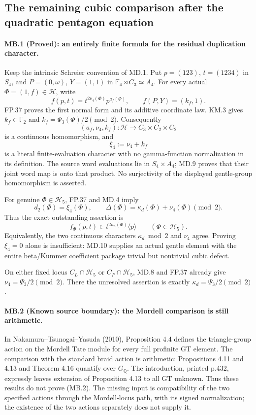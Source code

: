 \subsection*{The remaining cubic comparison after the quadratic pentagon equation}

\paragraph{MB.1 (Proved): an entirely finite formula for the residual duplication character.}
Keep the intrinsic Schreier convention of MD.1. Put
$p=(123)$, $t=(1234)$ in $S_4$, and
$P=(0,\omega)$, $Y=(1,1)$ in
$\mathbb F_4\rtimes C_3\simeq A_4$.
For every actual $\Phi=(1,f)\in\mathcal H$, write
\[
 f(p,t)=t^{2\nu_4(\Phi)}p^{a_f(\Phi)},\qquad
 f(P,Y)=(k_f,1).
\]
FP.37 proves the first normal form and its additive coordinate law.
KM.3 gives $k_f\in\mathbb F_2$ and
$k_f=\Psi_3(\Phi)/2\pmod2$.
Consequently
\[
 (a_f,\nu_4,k_f):\mathcal H\longrightarrow
           C_3\times C_2\times C_2
\]
is a continuous homomorphism, and
\[
 \xi_4:=\nu_4+k_f
\]
is a literal finite-evaluation character with no gamma-function
normalization in its definition. The source word evaluations lie
in $S_4\times A_4$; MD.9 proves that their joint word map is onto
that product. No surjectivity of the displayed gentle-group
homomorphism is asserted.

For genuine $\Phi\in\mathcal H_5$, FP.37 and MD.4 imply
\[
 d_2(\Phi)=\xi_4(\Phi),\qquad
 \Delta(\Phi)=\kappa_d(\Phi)+\nu_4(\Phi)\pmod2.
 \tag{MB.1}
\]
Thus the exact outstanding assertion is
\[
 \boxed{\quad
 f_\Phi(p,t)\in t^{2\kappa_d(\Phi)}\langle p\rangle
 \qquad(\Phi\in\mathcal H_5).
 \quad}
 \tag{MB.2}
\]
Equivalently, the two continuous characters $\kappa_d\bmod2$
and $\nu_4$ agree. Proving $\xi_4=0$ alone is insufficient:
MD.10 supplies an actual gentle element with the entire
beta/Kummer coefficient package trivial but nontrivial cubic defect.

On either fixed locus $C_L\cap\mathcal H_5$ or
$C_P\cap\mathcal H_5$, MD.8 and FP.37 already give
$\nu_4=\Psi_3/2\pmod2$. There the unresolved assertion is
exactly $\kappa_d=\Psi_3/2\pmod2$.

\paragraph{MB.2 (Known source boundary): the Mordell comparison is still arithmetic.}
In Nakamura--Tsunogai--Yasuda (2010), Proposition 4.4 defines
the triangle-group action on the Mordell Tate module for every
full profinite GT element. The comparison with the standard
braid action is arithmetic: Propositions 4.11 and 4.13 and
Theorem 4.16 quantify over $G_{\mathbb Q}$. The introduction,
printed p.432, expressly leaves extension of Proposition 4.13
to all GT unknown. Thus these results do not prove (MB.2).
The missing input is compatibility of the two specified actions
through the Mordell-locus path, with its signed normalization;
the existence of the two actions separately does not supply it.

